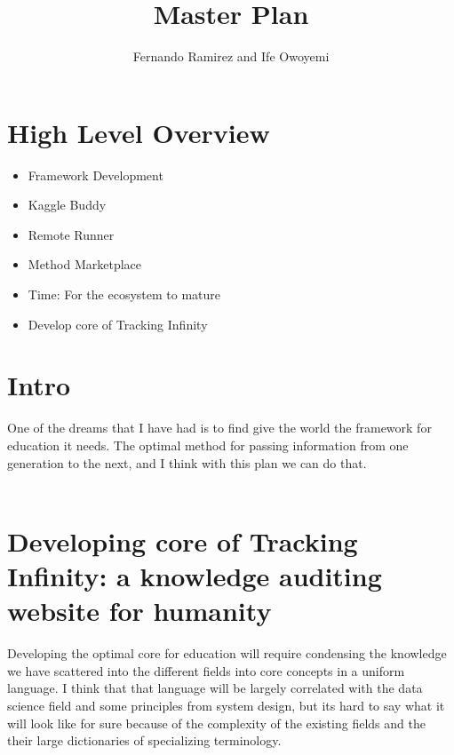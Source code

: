 \documentclass[11pt]{amsart}
\title{Master Plan}
\author{Fernando Ramirez and Ife Owoyemi}
\begin{document}
\maketitle
\section{High Level Overview}
\begin{itemize}
\item Framework Development
\item Kaggle Buddy
\item Remote Runner
\item Method Marketplace
\item Time: For the ecosystem to mature
\item Develop core of Tracking Infinity
\end{itemize}
\section{Intro}
One of the dreams that I have had is to find give the world the framework for education it needs.  The optimal method for passing information from one generation to the next, and I think with this plan we can do that.\\ \\
\section{Developing core of Tracking Infinity: a knowledge auditing website for humanity}
Developing the optimal core for education will require condensing the knowledge we have scattered into the different fields into core concepts in a uniform language.  I think that that language will be largely correlated with the data science field and some principles from system design, but its hard to say what it will look like for sure because of the complexity of the existing fields and the their large dictionaries of specializing terminology.\\ \\
\end{document}

